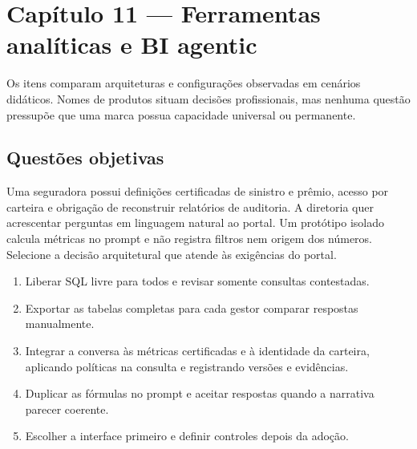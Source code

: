 \section{Capítulo 11 --- Ferramentas analíticas e BI agentic}

Os itens comparam arquiteturas e configurações observadas em cenários didáticos. Nomes de produtos situam decisões profissionais, mas nenhuma questão pressupõe que uma marca possua capacidade universal ou permanente.

\subsection{Questões objetivas}

\TextoBase
Uma seguradora possui definições certificadas de sinistro e prêmio, acesso por carteira e obrigação de reconstruir relatórios de auditoria. A diretoria quer acrescentar perguntas em linguagem natural ao portal. Um protótipo isolado calcula métricas no prompt e não registra filtros nem origem dos números.
\FonteDidatica
\Comando Selecione a decisão arquitetural que atende às exigências do portal.
\begin{enumerate}[label=\Alph*)]
\item Liberar SQL livre para todos e revisar somente consultas contestadas.
\item Exportar as tabelas completas para cada gestor comparar respostas manualmente.
\item Integrar a conversa às métricas certificadas e à identidade da carteira, aplicando políticas na consulta e registrando versões e evidências.
\item Duplicar as fórmulas no prompt e aceitar respostas quando a narrativa parecer coerente.
\item Escolher a interface primeiro e definir controles depois da adoção.
\end{enumerate}

